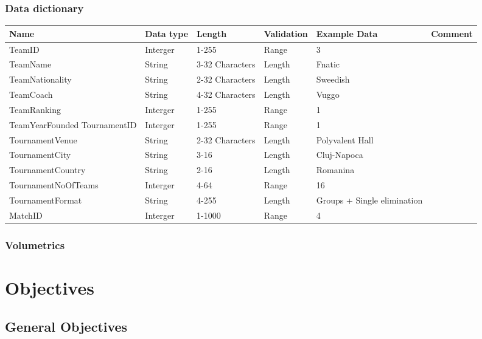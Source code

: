 \subsubsection{Data dictionary}
\begin{center}
	\begin{tabular}{|l|l|l|l|p{2.5cm}|l|}
	\hline
	\textbf{Name}&\textbf{Data type}&\textbf{Length}&\textbf{Validation}&\textbf{Example Data}&\textbf{Comment} \\ \hline
	TeamID&Interger&1-255&Range&3& \\ \hline
	TeamName&String&3-32 Characters & Length & Fnatic & \\ \hline
	TeamNationality&String&2-32 Characters & Length & Sweedish & \\ \hline
	TeamCoach&String&4-32 Characters & Length & Vuggo & \\ \hline
	TeamRanking&Interger&1-255&Range&1& \\ \hline
	TeamYearFounded%
	TournamentID & Interger&1-255&Range&1& \\ \hline
	TournamentVenue & String & 2-32 Characters&Length& Polyvalent Hall& \\ \hline
	TournamentCity & String & 3-16&Length&Cluj-Napoca& \\ \hline
	TournamentCountry&String&2-16&Length&Romanina& \\ \hline
	TournamentNoOfTeams&Interger&4-64&Range&16& \\ \hline
	TournamentFormat&String&4-255&Length&Groups + Single elimination& \\ \hline
	MatchID&Interger&1-1000&Range&4& \\ \hline

	
\end{tabular}
\end{center}
\subsubsection{Volumetrics}

\section{Objectives}

\subsection{General Objectives}

